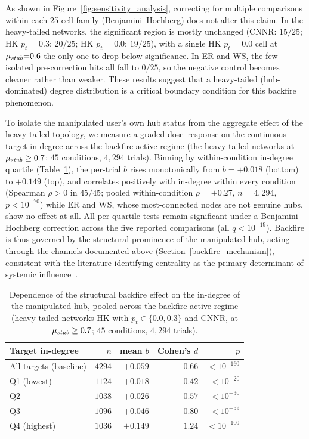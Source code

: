 \documentclass[pdflatex,sn-mathphys-num]{sn-jnl}%
\theoremstyle{thmstyleone}%
\theoremstyle{thmstyletwo}%
\theoremstyle{thmstylethree}%
\def\Stubbornness{\mu_{\it stub}}
\begin{document}
As shown in Figure~\ref{fig:sensitivity_analysis}, correcting for multiple comparisons within each 25-cell family
(Benjamini--Hochberg) does not alter this claim. In the heavy-tailed
networks, the significant region is mostly unchanged
(CNNR: $15/25$; HK $p_t{=}0.3$: $20/25$; HK $p_t{=}0.0$: $19/25$),
with a single HK $p_t{=}0.0$ cell at $\Stubbornness{=}0.6$ the only one
to drop below significance. In ER and WS, the few isolated pre-correction
hits all fall to $0/25$, so the negative control becomes cleaner rather
than weaker. These results suggest that a heavy-tailed (hub-dominated)
degree distribution is a critical boundary condition for this backfire phenomenon.
\par

To isolate the manipulated user's own hub status from the aggregate effect of the
heavy-tailed topology, we measure a graded dose--response on the continuous target
in-degree across the backfire-active regime (the heavy-tailed networks at
$\Stubbornness \geq 0.7$; $45$ conditions, $4{,}294$ trials). Binning by
within-condition in-degree quartile (Table~\ref{tab:doseresponse}), the per-trial
$b$ rises monotonically from $\bar b = +0.018$ (bottom) to $+0.149$ (top), and
correlates positively with in-degree within every condition (Spearman $\rho > 0$ in
$45/45$; pooled within-condition $\rho = +0.27$, $n = 4{,}294$, $p < 10^{-70}$) while ER
and WS, whose most-connected nodes are not genuine hubs, show no effect at all.
All per-quartile tests remain significant under a Benjamini--Hochberg correction across
the five reported comparisons (all $q < 10^{-19}$).
Backfire is thus governed by the structural prominence of the manipulated hub,
acting through the channels documented above (Section~\ref{backfire_mechanism}), consistent with the literature
identifying centrality as the primary determinant of systemic
influence~\cite{Kitsak2010,Kempe2003}.
\par

\begin{table}[t]
  \tabcolsep=6pt
  \centering
  \caption{Dependence of the structural backfire effect on the in-degree of the
  manipulated hub, pooled across the backfire-active regime (heavy-tailed networks
  HK with $p_t{\in}\{0.0,0.3\}$ and CNNR, at $\Stubbornness \geq 0.7$; $45$
  conditions, $4{,}294$ trials).}
  \label{tab:doseresponse}
  \begin{tabular}{lrrrr}
    \toprule
    Target in-degree & $n$ & mean $b$ & Cohen's $d$ & $p$ \\
    \midrule
    All targets (baseline) & $4294$ & $+0.059$ & $0.66$  & $<10^{-160}$ \\
    \midrule
    Q1 (lowest)  & $1124$ & $+0.018$ & $0.42$ & $<10^{-20}$ \\
    Q2           & $1038$ & $+0.026$ & $0.57$ & $<10^{-30}$ \\
    Q3           & $1096$ & $+0.046$ & $0.80$ & $<10^{-59}$ \\
    Q4 (highest) & $1036$ & $+0.149$ & $1.24$ & $<10^{-100}$ \\
    \bottomrule
  \end{tabular}
\end{table}
\end{document}
